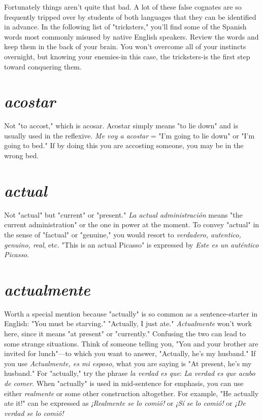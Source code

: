 \documentclass[14pt,a4paper,oneside]{memoir}
\begin{document}
Fortunately things aren't quite that bad. A lot of these false
cognates are so frequently tripped over by students of both languages
that they can be identified in advance. In the following list of "tricksters," you'll find some of the Spanish words most commonly misused
by native English speakers. Review the words and keep them in the
back of your brain. You won't overcome all of your instincts overnight,
but knowing your enemies-in this case, the tricksters-is the first
step toward conquering them.

\section{\emph{acostar}}

Not "to accost," which is acosar. Acostar simply
means "to lie down" and is usually used in the reflexive. \emph{Me voy a
	acostar} = "I'm going to lie down" or "I'm going to bed." If by doing
this you are accosting someone, you may be in the wrong bed.

\section{\emph{actual}}

Not "actual" but "current" or "present." \emph{La actual
	administración} means "the current administration" or the one in power
at the moment. To convey "actual" in the sense of "factual" or "genuine," you would resort to \emph{verdadero, autentico, genuino, real}, etc. "This
is an actual Picasso" is expressed by \emph{Este es un auténtico Picasso}.

\section{\emph{actualmente}}

Worth a special mention because "actually"
is so common as a sentence-starter in English: "You must be starving."
"Actually, I just ate." \emph{Actualmente} won't work here, since it means
"at present" or "currently." Confusing the two can lead to some
strange situations. Think of someone telling you, "You and your
brother are invited for lunch"---to which you want to answer, "Actually, he's my husband." If you use \emph{Actualmente, es mi esposo}, what
you are saying is "At present, he's my husband." For "actually," try the
phrase \emph{la verdad es que}: \emph{La verdad es que acabo de comer}. When "actually" is used in mid-sentence for emphasis, you can use either
\emph{realmente} or some other construction altogether. For example, "He actually ate it!" can be expressed as \emph{¡Realmente se lo comió!} or \emph{¡Sí se lo
	comió!} or \emph{¡De verdad se lo comió!}
\end{document}
